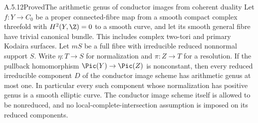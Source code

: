 \begin{statement}{A.5.12}{Proved}{The arithmetic genus of conductor images from coherent duality}
Let $f:Y\to C_0$ be a proper connected-fibre map from a
smooth compact complex threefold with $H^2(Y,\Z)=0$ to
a smooth curve, and let its smooth general fibre have
trivial canonical bundle. This includes complex
two-tori and primary Kodaira surfaces.
Let $mS$ be a full fibre with irreducible
reduced nonnormal support $S$. Write $\eta:T\to S$ for
normalization and $\pi:Z\to T$ for a resolution.
If the pullback homomorphism
$\Pic(Y)\to\Pic(Z)$ is nonconstant, then every reduced
irreducible component $D$ of the conductor image scheme
has arithmetic genus at most one.
In particular every such component whose normalization
has positive genus is a smooth elliptic curve.
The conductor image scheme itself is allowed to be
nonreduced, and no local-complete-intersection assumption
is imposed on its reduced components.
\end{statement}
